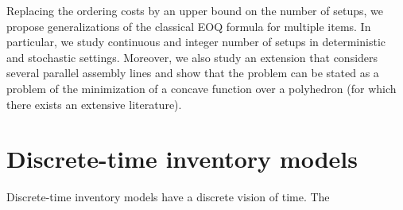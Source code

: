 \medskip


Replacing the ordering costs by an upper bound on the number of setups, we propose generalizations of the classical EOQ formula for multiple items.
In particular, we study continuous and integer number of setups in deterministic and stochastic settings.
Moreover, we also study an extension that considers several parallel assembly lines and show that the problem can be stated as a problem of the minimization of a concave function over a polyhedron (for which there exists an extensive literature).




\section{Discrete-time inventory models}
\label{sec:intro:en:discrete-time-inventory-models}


Discrete-time inventory models have a discrete vision of time.
The 


